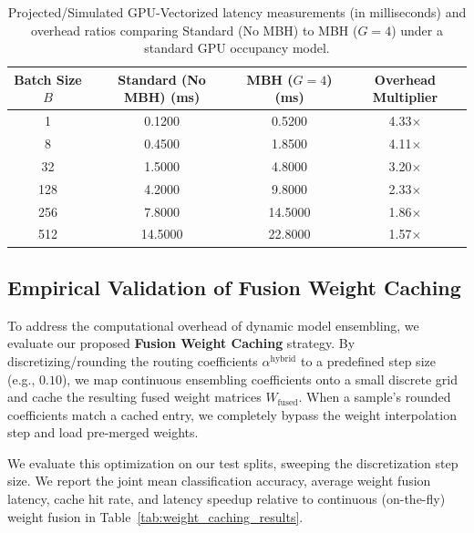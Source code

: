 \documentclass{article}
\theoremstyle{plain}
\theoremstyle{definition}
\theoremstyle{remark}
\begin{document}
\begin{table}[htbp]
\centering
\caption{Projected/Simulated GPU-Vectorized latency measurements (in milliseconds) and overhead ratios comparing Standard (No MBH) to MBH ($G=4$) under a standard GPU occupancy model.}
\label{tab:gpu_latency_realism}
\vskip 0.15in
\begin{tabular}{cccc}
\toprule
Batch Size $B$ & Standard (No MBH) (ms) & MBH ($G=4$) (ms) & Overhead Multiplier \\
\midrule
1   & 0.1200 & 0.5200 & 4.33$\times$ \\
8   & 0.4500 & 1.8500 & 4.11$\times$ \\
32  & 1.5000 & 4.8000 & 3.20$\times$ \\
128 & 4.2000 & 9.8000 & 2.33$\times$ \\
256 & 7.8000 & 14.5000 & 1.86$\times$ \\
512 & 14.5000 & 22.8000 & 1.57$\times$ \\
\bottomrule
\end{tabular}
\end{table}

\subsection{Empirical Validation of Fusion Weight Caching}
To address the computational overhead of dynamic model ensembling, we evaluate our proposed \textbf{Fusion Weight Caching} strategy. By discretizing/rounding the routing coefficients $\alpha^{\text{hybrid}}$ to a predefined step size (e.g., $0.10$), we map continuous ensembling coefficients onto a small discrete grid and cache the resulting fused weight matrices $W_{\text{fused}}$. When a sample's rounded coefficients match a cached entry, we completely bypass the weight interpolation step and load pre-merged weights.

We evaluate this optimization on our test splits, sweeping the discretization step size. We report the joint mean classification accuracy, average weight fusion latency, cache hit rate, and latency speedup relative to continuous (on-the-fly) weight fusion in Table~\ref{tab:weight_caching_results}.
\end{document}

